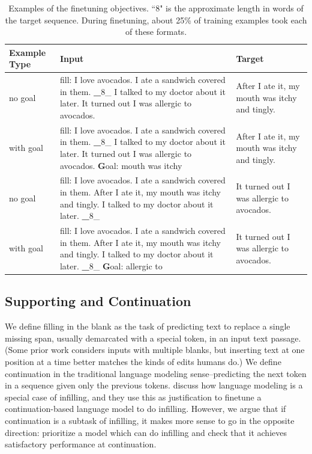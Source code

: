 \begin{table}[t]
  \centering
  \small
  \caption{Examples of the finetuning objectives. ``8" is the approximate length in words of the target sequence. During finetuning, about 25\% of training examples took each of these formats.}
    \begin{tabular}{p{}p{}p{}}
    \midrule
    Example Type & Input & Target \\
    \midrule
     \cFITB{} no goal & fill: I love avocados. I ate a sandwich covered in them. {\textbf \_8\_} I talked to my doctor about it later. It turned out I was allergic to avocados. & After I ate it, my mouth was itchy and tingly. \\
    \midrule
     \cFITB{}  with goal & fill: I love avocados. I ate a sandwich covered in them.  {\textbf \_8\_} I talked to my doctor about it later. It turned out I was allergic to avocados.  {\textbf Goal: mouth was itchy} & After I ate it, my mouth was itchy and tingly. \\
    \midrule
     \cFITB{} no goal& fill: I love avocados. I ate a sandwich covered in them. After I ate it, my mouth was itchy and tingly. I talked to my doctor about it later.  {\textbf \_8\_}  & It turned out I was allergic to avocados. \\
    \midrule
     \cFITE{} with goal & fill: I love avocados. I ate a sandwich covered in them. After I ate it, my mouth was itchy and tingly. I talked to my doctor about it later.  {\textbf \_8\_}   {\textbf Goal: allergic to} & It turned out I was allergic to avocados. \\
    \midrule
    \end{tabular}
  \label{tab:task_examples}
\end{table}%

\subsection{Supporting \FitB{} and Continuation}
\label{section:fitb_fite_methods}
We define filling in the blank as the task of predicting text to replace a single missing span, usually demarcated with a special token, in an input text passage. (Some prior work considers inputs with multiple blanks, but inserting text at one position at a time better matches the kinds of edits humans do.)
We define continuation in the traditional language modeling sense--predicting the next token in a sequence given only the previous tokens.
\citet{donahue2020enabling} discuss how language modeling is a special case of infilling, and they use this as justification to finetune a continuation-based language model to do infilling.
However, we argue that if continuation is a subtask of infilling, it makes more sense to go in the opposite direction: prioritize a model which can do infilling and check that it achieves satisfactory performance at continuation.

